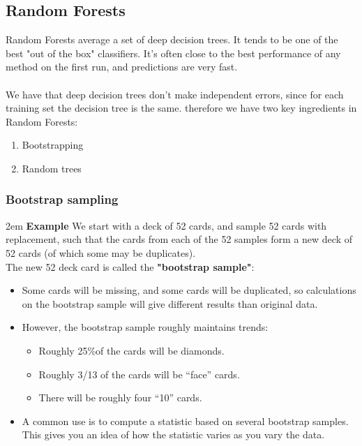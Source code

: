\documentclass{article}
\def\blu#1{{\color{blu}#1}}
\def\gre#1{{\color{gre}#1}}
\theoremstyle{definition}
\begin{document}
\subsection*{Random Forests}
Random Forests \blu{average a set of deep decision trees}. It tends to be \gre{one of the best "out of the box" classifiers}. It's often close to the best performance of any method on the first run, and \gre{predictions are very fast}. \\ \\
We have that deep decision trees don't make independent errors, since for each training set the decision tree is the same. therefore we have two key ingredients in Random Forests:
\begin{enumerate}
	\item \blu{Bootstrapping}
	\item \blu{Random trees}
\end{enumerate}
\subsubsection*{Bootstrap sampling}
\begingroup
\leftskip2em
\textbf{Example}
We start with a deck of 52 cards, and sample 52 cards with replacement, such that the cards from each of the 52 samples form a new deck of 52 cards (of which some may be duplicates).\\
The new 52 deck card is called the \textbf{\blu{"bootstrap sample"}}:
\begin{itemize}
	\item Some \gre{cards will be missing}, and some \gre{cards will be duplicated}, so calculations on the bootstrap sample will give different results than original data.
	\item However, the bootstrap sample roughly maintains trends:
	\begin{itemize}
		\item Roughly 25\%of the cards will be diamonds.
		\item Roughly 3/13 of the cards will be “face” cards.
		\item There will be roughly four “10” cards.
	\end{itemize}
\item A common use is to compute a statistic based on \gre{several bootstrap samples}. This gives you an idea of \gre{how the statistic varies as you vary the data}.
\end{itemize}
\endgroup
\end{document}
